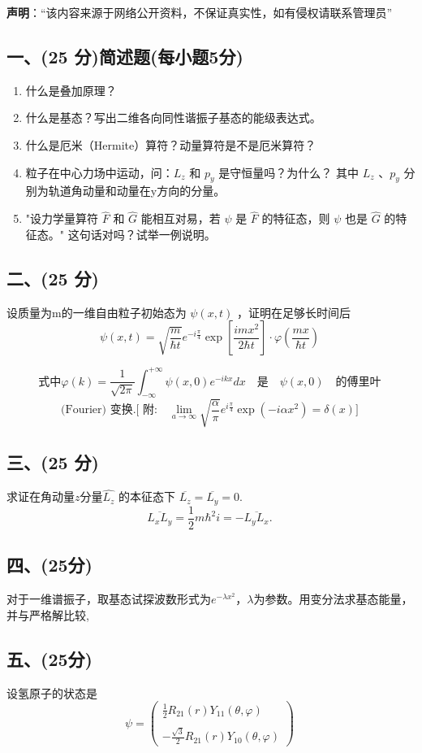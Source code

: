 
\textbf{声明}：“该内容来源于网络公开资料，不保证真实性，如有侵权请联系管理员”

\subsection{一、(25 分)简述题(每小题5分)}
\begin{enumerate}
        \item 什么是叠加原理？
        \item 什么是基态？写出二维各向同性谐振子基态的能级表达式。
        \item 什么是厄米（Hermite）算符？动量算符是不是厄米算符？
        \item 粒子在中心力场中运动，问：$L_z$ 和 $p_y$ 是守恒量吗？为什么？
        其中 $L_z$ 、$p_y$ 分别为轨道角动量和动量在y方向的分量。
        \item "设力学量算符 $\hat{F}$ 和 $\hat{G}$ 能相互对易，若 $\psi$ 是 $\hat{F}$ 的特征态，则 $\psi$ 也是 $\hat{G}$ 的特征态。" 这句话对吗？试举一例说明。
    \end{enumerate}
\subsection{二、(25 分)}
设质量为m的一维自由粒子初始态为 $\psi(x,t)$ ，证明在足够长时间后
$$\psi(x,t) = \sqrt{\frac{m}{\hbar t}} e^{-i\frac{\pi}{4}} \exp \left[ \frac{imx^2}{2\hbar t} \right] \cdot \varphi \left( \frac{mx}{\hbar t} \right)~$$

$$\text{式中}\varphi(k) = \frac{1}{\sqrt{2\pi}} \int_{-\infty}^{+\infty} \psi(x, 0) e^{-ikx} dx \quad \text{是} \quad \psi(x, 0) \quad \text{的傅里叶}~$$
$$\text{(Fourier) 变换.[ 附:} \quad \lim_{a \to \infty} \sqrt{\frac{\alpha}{\pi}} e^{i \frac{\pi}{4}} \exp(-i \alpha x^2) = \delta(x)]~$$
\subsection{三、(25 分)}
求证在角动量$z$分量$\hat{L_z}$ 的本征态下 $\overline{L_z} = \overline{L_y} = 0.$
$$\overline{L_x L_y} = \frac{1}{2} m \hbar^2 i = - \overline{L_y L_x}.~$$
\subsection{四、(25分)}
对于一维谱振子，取基态试探波数形式为$e^{-\lambda x^2}$，$\lambda$为参数。用变分法求基态能量，并与严格解比较,
\subsection{五、(25分)}
设氢原子的状态是
$$\psi = \begin{pmatrix}\frac{1}{2} R_{21}(r)Y_{11}(\theta, \varphi) \\\\-\frac{\sqrt{3}}{2} R_{21}(r)Y_{10}(\theta, \varphi)\end{pmatrix}~$$

